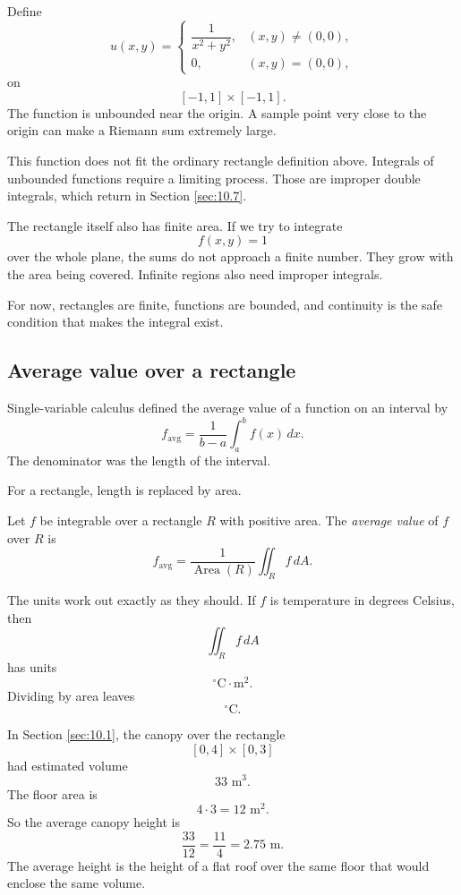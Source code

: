 \begin{example}
Define
\[
    u(x,y)=
    \begin{cases}
    \dfrac{1}{x^2+y^2}, & (x,y)\ne(0,0),\\[2mm]
    0, & (x,y)=(0,0),
    \end{cases}
\]
on
\[
    [-1,1]\times[-1,1].
\]
The function is unbounded near the origin.  A sample point very close to the origin
can make a Riemann sum extremely large.

This function does not fit the ordinary rectangle definition above.  Integrals of
unbounded functions require a limiting process.  Those are improper double integrals,
which return in Section \ref{sec:10.7}.
\end{example}

The rectangle itself also has finite area.  If we try to integrate
\[
    f(x,y)=1
\]
over the whole plane, the sums do not approach a finite number.  They grow with the
area being covered.  Infinite regions also need improper integrals.

For now, rectangles are finite, functions are bounded, and continuity is the safe
condition that makes the integral exist.

\subsection{Average value over a rectangle}

Single-variable calculus defined the average value of a function on an interval by
\[
    f_{\text{avg}}
    =
    \frac{1}{b-a}\int_a^b f(x)\,dx.
\]
The denominator was the length of the interval.

For a rectangle, length is replaced by area.

\begin{definition}
Let \(f\) be integrable over a rectangle \(R\) with positive area.  The \emph{average
value} of \(f\) over \(R\) is
\[
\boxed{
    f_{\text{avg}}
    =
    \frac{1}{\operatorname{Area}(R)}
    \iint_R f\,dA.
}
\]
\end{definition}

The units work out exactly as they should.  If \(f\) is temperature in degrees Celsius,
then
\[
    \iint_R f\,dA
\]
has units
\[
    ^\circ\text{C}\cdot \text{m}^2.
\]
Dividing by area leaves
\[
    ^\circ\text{C}.
\]

\begin{example}
In Section \ref{sec:10.1}, the canopy over the rectangle
\[
    [0,4]\times[0,3]
\]
had estimated volume
\[
    33\text{ m}^3.
\]
The floor area is
\[
    4\cdot 3=12\text{ m}^2.
\]
So the average canopy height is
\[
    \frac{33}{12}=\frac{11}{4}=2.75\text{ m}.
\]
The average height is the height of a flat roof over the same floor that would enclose
the same volume.
\end{example}

